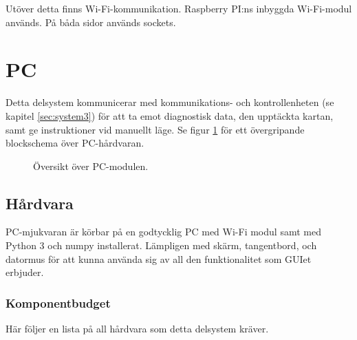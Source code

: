 \documentclass[a4paper,11pt]{article}
\begin{document}
Utöver detta finns Wi-Fi-kommunikation. Raspberry PI:ns inbyggda Wi-Fi-modul används. På båda sidor används sockets.

\newpage
\section{PC} \label{sec:system4}
Detta delsystem kommunicerar med kommunikations- och kontrollenheten (se kapitel \ref{sec:system3}) för att ta emot diagnostisk data, den upptäckta kartan, samt ge instruktioner vid manuellt läge. Se figur \ref{fig:unitPC} för ett övergripande blockschema över PC-hårdvaran.

\begin{figure}[h!]
    \caption{Översikt över PC-modulen.}
    \label{fig:unitPC}
\end{figure}
\subsection{Hårdvara}
PC-mjukvaran är körbar på en godtycklig PC med Wi-Fi modul samt med Python 3 och numpy installerat. Lämpligen med skärm, tangentbord, och datormus för att kunna använda sig av all den funktionalitet som GUIet erbjuder.

\subsubsection{Komponentbudget}
Här följer en lista på all hårdvara som detta delsystem kräver.

\begin{center}
\begin{HardwareList}
\end{HardwareList}
\end{center}
\end{document}
